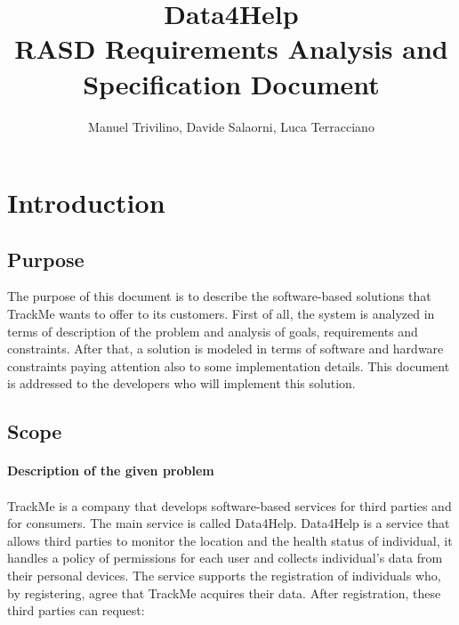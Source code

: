 \documentclass[a4paper]{article}
\begin{document}
    
    \author{Manuel Trivilino, Davide Salaorni, Luca Terracciano}
    
    \title{\Large Data4Help\\
    \Large RASD Requirements Analysis and Specification Document
    }
    
    \maketitle
    \newpage
    
    \tableofcontents
    \newpage
    
    \section{Introduction}
    
    \subsection{Purpose}
    The purpose of this document is to describe the software-based solutions that TrackMe wants to offer to its customers. First of all, the system is analyzed in terms of description of the problem and analysis of goals, requirements and constraints. After that, a solution is modeled in terms of software and hardware constraints paying attention also to some implementation details. This document is addressed to the developers who will implement this solution.
    
    \subsection{Scope}
    
    \paragraph{Description of the given problem}
    
    \paragraph{}
    TrackMe is a company that develops software-based services for third parties and for consumers. The main service is called Data4Help.
     Data4Help is a service that allows third parties to monitor the location and the health status of individual, it handles a policy of permissions for each user and collects individual’s data from their personal devices.
    The service supports the registration of individuals who, by registering, agree that TrackMe acquires their data. After registration, these third parties can request:
    
\end{document}
